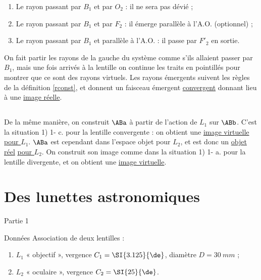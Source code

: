 \documentclass[../main/main.tex]{subfiles}
\begin{document}
\begin{enumerate}
    \item Le rayon passant par $B_1$ et par $O_2$ : il ne sera pas dévié ;
    \item Le rayon passant par $B_1$ et par $F_2$ : il émerge parallèle à l'A.O.
        (optionnel) ;
    \item Le rayon passant par $B_1$ et parallèle à l'A.O. : il passe par $F'_2$
        en sortie.
\end{enumerate}

On fait partir les rayons de la gauche du système comme s'ils allaient passer
par $B_1$, mais une fois arrivés à la lentille on continue les traits en
pointillés pour montrer que ce sont des rayons virtuels. Les rayons émergents
suivent les règles de la définition \ref{rconst}, et donnent un faisceau
émergent \underline{convergent} donnant lieu à une \underline{image réelle}.

\begin{center}
    
\end{center}

\subsection{}
De la même manière, on construit $\ABa$ à partir de l'action de $L_1$ sur
$\ABb$.  C'est la situation 1) 1- c. pour la lentille convergente : on obtient
une \underline{image virtuelle} \underline{\underline{pour $L_1$}}. $\ABa$ est
cependant dans l'espace objet pour $L_2$, et est donc un \underline{objet réel}
\underline{\underline{pour $L_2$}}. On construit son image comme dans la
situation 1) 1- a. pour la lentille divergente, et on obtient une
\underline{image virtuelle}.

\begin{center}
    
\end{center}

\section{Des lunettes astronomiques}
\begin{center}
    \huge Partie 1
\end{center}

\begin{center}
    \begin{NCdefi}[width=.7\linewidth]{Données}
    Association de deux lentilles :
    \begin{enumerate}
        \item $L_1$ « objectif », vergence $C_1 = \SI{3.125}{\de}$, diamètre $D
            = \SI{30}{mm}$ ;
        \item $L_2$ « oculaire », vergence $C_2 = \SI{25}{\de}$.
    \end{enumerate}
\end{NCdefi}
\end{center}
\end{document}
